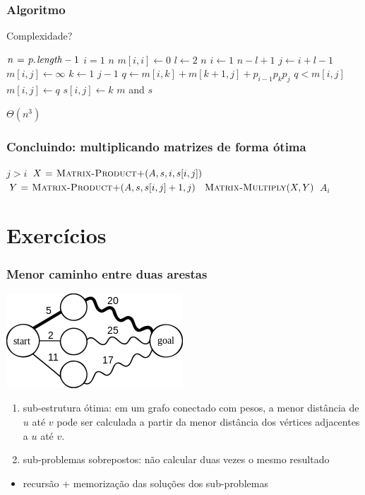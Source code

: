 \documentclass{beamer}
\begin{document}
\begin{frame}

\frametitle{Algoritmo}

{ \center \alert{Complexidade?}}

\begin{codebox}
\li $n \gets \attrib{p}{length} - 1$
\li \For $i = 1$ \To $n$
\li   \Do $m[i, i] \gets 0$
    \End
\li \For $l \gets 2$ \To $n$
\li \Do \For $i \gets 1$ \To $n-l+1$
\li   \Do $j \gets i+l-1$
\li     $m[i, j] \gets \infty$
\li     \For $k \gets 1$ \To $j-1$
\li     \Do $q \gets m[i, k]+m[k+1, j]+p_{i-1}p_kp_j$
\li       \If $q < m[i, j]$
\li       \Then $m[i, j] \gets q$
\li         $s[i, j] \gets k$
          \End
        \End
      \End
    \End
\li \Return $m$ and $s$
\end{codebox}
\pause
\alert{$\Theta(n^3)$}
\end{frame}

\begin{frame}
\frametitle{Concluindo: multiplicando matrizes de forma ótima}

\begin{codebox}
\li \If $j > i$
\li \Then $X \mathrel{\hspace{1pt}=\hspace{1pt}} \textnormal{\scshape Matrix-Product+}(A, s, i, s[i, j])$
\li    $Y \mathrel{\hspace{1pt}=\hspace{1pt}} \textnormal{\scshape Matrix-Product+}(A, s, s[i, j]+1, j)$
\li    \Return $\textnormal{\scshape Matrix-Multiply}(X, Y)$
\li \Else \Return $A_i$
    \End
\end{codebox}

\end{frame}

\section{Exercícios}

\begin{frame}

\frametitle{Menor caminho entre duas arestas}

\begin{center}
\includegraphics{img/Shortest-path-optimal-substructure.png}
\end{center}

\begin{enumerate}
\item sub-estrutura ótima: em um grafo conectado com pesos, a menor distância de
  $u$ até $v$ pode ser calculada a partir da menor distância dos vértices
  adjacentes a $u$ até $v$.
\item sub-problemas sobrepostos: não calcular duas vezes o mesmo resultado
\end{enumerate}
\begin{itemize}
\item recursão + memorização das soluções dos sub-problemas
\end{itemize}

\end{frame}
\end{document}
